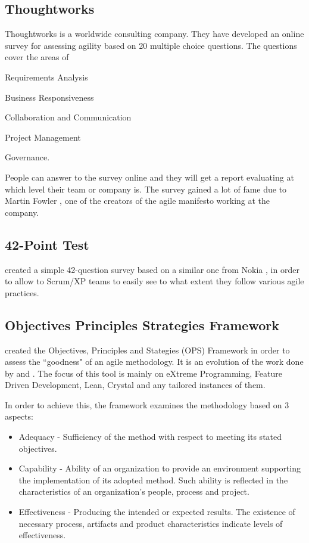 \subsection{Thoughtworks} %
Thoughtworks \cite{thoughtworks} is a worldwide consulting company. They have developed an online survey for assessing agility based on 20 multiple choice questions. The questions cover the areas of 
\begin{inparaenum} [a\upshape)]
	\item Requirements Analysis
	\item Business Responsiveness
	\item Collaboration and Communication
	\item Project Management
	\item Governance.
\end{inparaenum}
People can answer to the survey online and they will get a report evaluating at which level their team or company is. The survey gained a lot of fame due to Martin Fowler \cite{martin_fowler}, one of the creators of the agile manifesto working at the company.

\subsection{42-Point Test}
\citet{42points} created a simple 42-question survey based on a similar one from Nokia \cite{nokia}, in order to allow to Scrum/XP teams to easily see to what extent they follow various agile practices.

\subsection{Objectives Principles Strategies Framework}
\label{subsec:ops}
\citet{sventha_dissertation} created the Objectives, Principles and Stategies (OPS) Framework in order to assess the ``goodness" of an agile methodology. It is an evolution of the work done by \citet{2604} and \citet{sidky_dissertation}. The focus of this tool is mainly on eXtreme Programming, Feature Driven Development, Lean, Crystal and any tailored instances of them.

In order to achieve this, the framework examines the methodology based on 3 aspects:
\begin{itemize}
\item Adequacy - Sufficiency of the method with respect to meeting its stated objectives.
\item Capability - Ability of an organization to provide an environment supporting the implementation of its adopted method. Such ability is reflected in the characteristics of an organization's people, process
and project.
\item Effectiveness - Producing the intended or expected results. The existence of necessary process, artifacts and product characteristics indicate levels of effectiveness.
\end{itemize}

